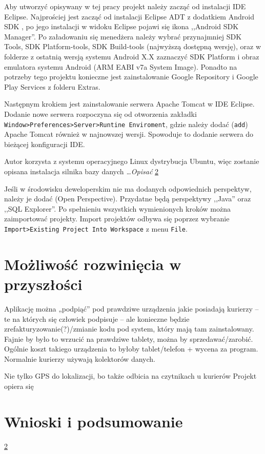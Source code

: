 \documentclass[eng,printmode,oneside]{mgr}
\begin{document}
Aby utworzyć opisywany w tej pracy projekt należy zacząć od instalacji IDE
Eclipse. Najprościej jest zacząć od instalacji Eclipse ADT z dodatkiem Android
SDK \cite{eclipse}, po jego instalacji w widoku Eclipse pojawi się ikona
,,Android SDK Manager''. Po załadowaniu się menedżera należy wybrać przynajmniej
SDK Tools, SDK Platform-tools, SDK Build-tools (najwyższą dostępną wersję), oraz w folderze z ostatnią wersją systemu Android X.X zaznaczyć SDK Platform i
obraz emulatora systemu Android (ARM EABI v7a System Image). Ponadto na
potrzeby tego projektu konieczne jest zainstalowanie Google Repository i Google
Play Services z folderu Extras.

Następnym krokiem jest zainstalowanie serwera Apache Tomcat w IDE Eclipse.
Dodanie nowe serwera rozpoczyna się od otworzenia zakładki
\texttt{Window>Preferences>Server>Runtine Enviroment}, gdzie należy dodać
(\texttt{add}) Apache Tomcat również w najnowszej wersji. Spowoduje to
dodanie serwera do bieżącej konfiguracji IDE.

Autor korzysta z systemu operacyjnego Linux dystrybucja Ubuntu, więc zostanie
opisana instalacja silnika bazy danych \emph{\color{komentarz}\ldots Opisać}
\ref{}

Jeśli w środowisku deweloperskim nie ma dodanych odpowiednich perspektyw,
należy je dodać (Open Perspective). Przydatne będą perspektywy
,,Java'' oraz ,,SQL Explorer''.
Po spełnieniu wszystkich wymienionych kroków można zaimportować
projekty. Import projektów odbywa się poprzez wybranie
\texttt{Import>Existing Project Into Workspace} z menu \texttt{File}.

\chapter{Możliwość rozwinięcia w przyszłości}
Aplikację można „podpiąć” pod prawdziwe urządzenia jakie posiadają kurierzy – te
na których się człowiek podpisuje – ale konieczne będzie
zrefakturyzowanie(?)/zmianie kodu pod system, który mają tam zainstalowany.
	Fajnie by było to wrzucić na prawdziwe tablety, można by sprzedawać/zarobić.
	Ogólnie koszt takiego urządzenia to byłoby tablet/telefon + wycena za program.
	Normalnie kurierzy używają kolektorów danych.
	
	
 Nie tylko GPS do lokalizacji, bo także odbicia
na czytnikach u kurierów Projekt opiera się 

\chapter{Wnioski i podsumowanie}

\ref{}


\listoffigures
\lstlistoflistings
\end{document}
